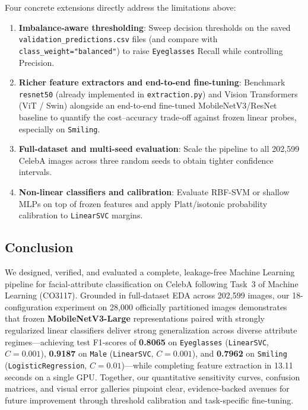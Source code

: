 \documentclass[12pt,a4paper]{article}
\newcommand{\code}[1]{\texttt{#1}}
\begin{document}
Four concrete extensions directly address the limitations above:
\begin{enumerate}[leftmargin=20pt, itemsep=2pt]
  \item \textbf{Imbalance-aware thresholding}: Sweep decision thresholds on the saved \code{validation\_\allowbreak{}predictions.csv} files (and compare with \code{class\_\allowbreak{}weight="balanced"}) to raise \code{Eyeglasses} Recall while controlling Precision.
  \item \textbf{Richer feature extractors and end-to-end fine-tuning}: Benchmark \code{resnet50} (already implemented in \code{extraction.py}) and Vision Transformers (ViT / Swin) alongside an end-to-end fine-tuned MobileNetV3/ResNet baseline to quantify the cost--accuracy trade-off against frozen linear probes, especially on \code{Smiling}.
  \item \textbf{Full-dataset and multi-seed evaluation}: Scale the pipeline to all 202,599 CelebA images across three random seeds to obtain tighter confidence intervals.
  \item \textbf{Non-linear classifiers and calibration}: Evaluate RBF-SVM or shallow MLPs on top of frozen features and apply Platt/isotonic probability calibration to \code{LinearSVC} margins.
\end{enumerate}

\subsection{Conclusion}
\label{subsec:conclusion}

We designed, verified, and evaluated a complete, leakage-free Machine Learning pipeline for facial-attribute classification on CelebA following Task~3 of Machine Learning (CO3117). Grounded in full-dataset EDA across 202,599 images, our 18-configuration experiment on 28,000 officially partitioned images demonstrates that frozen \textbf{MobileNetV3-Large} representations paired with strongly regularized linear classifiers deliver strong generalization across diverse attribute regimes---achieving test F1-scores of \textbf{0.8065} on \code{Eyeglasses} (\code{LinearSVC}, $C=0.001$), \textbf{0.9187} on \code{Male} (\code{LinearSVC}, $C=0.001$), and \textbf{0.7962} on \code{Smiling} (\code{LogisticRegression}, $C=0.01$)---while completing feature extraction in 13.11 seconds on a single GPU. Together, our quantitative sensitivity curves, confusion matrices, and visual error galleries pinpoint clear, evidence-backed avenues for future improvement through threshold calibration and task-specific fine-tuning.
\end{document}
